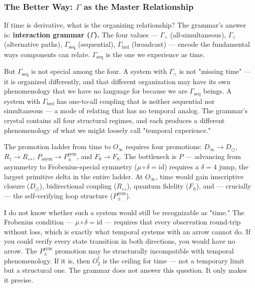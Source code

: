 \documentclass[12pt,a4paper]{article}
\begin{document}
\subsubsection{The Better Way: $\Gamma$ as the Master Relationship}

If time is derivative, what is the organizing relationship? The grammar's answer is: \textbf{interaction grammar ($\Gamma$).} The four values --- $\Gamma_{\wedge}$ (all-simultaneous), $\Gamma_{\vee}$ (alternative paths), $\Gamma_\text{seq}$ (sequential), $\Gamma_\text{brd}$ (broadcast) --- encode the fundamental ways components can relate. $\Gamma_\text{seq}$ is the one we experience as time.

But $\Gamma_\text{seq}$ is not special among the four. A system with $\Gamma_{\wedge}$ is not "missing time" --- it is organized differently, and that different organization may have its own phenomenology that we have no language for because we are $\Gamma_\text{seq}$ beings. A system with $\Gamma_\text{brd}$ has one-to-all coupling that is neither sequential nor simultaneous --- a mode of relating that has no temporal analog. The grammar's crystal contains all four structural regimes, and each produces a different phenomenology of what we might loosely call "temporal experience."

The promotion ladder from time to $O_{\infty}$ requires four promotions: $D_{\infty} \to D_{\odot}$, $R_{\dagger} \to R_{\leftrightarrow}$, $P_\text{asym} \to P_{\pm}^{\text{sym}}$, and $F_{\eth} \to F_{\hbar}$. The bottleneck is $P$ --- advancing from asymmetry to Frobenius-special symmetry ($\mu \circ \delta = \text{id}$) requires a $\delta = 4$ jump, the largest primitive delta in the entire ladder. At $O_{\infty}$, time would gain imscriptive closure ($D_{\odot}$), bidirectional coupling ($R_{\leftrightarrow}$), quantum fidelity ($F_{\hbar}$), and --- crucially --- the self-verifying loop structure ($P_{\pm}^{\text{sym}}$).

I do not know whether such a system would still be recognizable as "time." The Frobenius condition --- $\mu \circ \delta = \text{id}$ --- requires that every observation round-trip without loss, which is exactly what temporal systems with an arrow cannot do. If you could verify every state transition in both directions, you would have no arrow. The $P_{\pm}^{\text{sym}}$ promotion may be structurally incompatible with temporal phenomenology. If it is, then $O_2^\dagger$ is the ceiling for time --- not a temporary limit but a structural one. The grammar does not answer this question. It only makes it precise.
\end{document}
